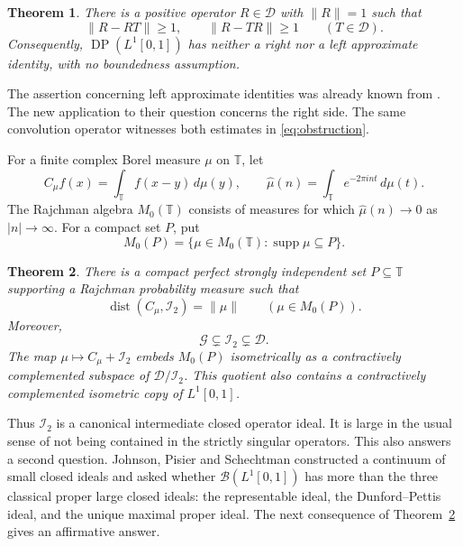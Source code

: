 \documentclass[11pt,reqno]{amsart}
\newtheorem{theorem}{Theorem}[section]
\theoremstyle{definition}
\theoremstyle{remark}
\newcommand{\T}{\mathbb T}
\newcommand{\B}{\mathcal B}
\newcommand{\D}{\mathcal D}
\newcommand{\G}{\mathcal G}
\newcommand{\I}{\mathcal I}
\newcommand{\DP}{\operatorname{DP}}
\newcommand{\supp}{\operatorname{supp}}
\newcommand{\dist}{\operatorname{dist}}
\begin{document}
\begin{theorem}\label{thm:ai}
There is a positive operator $R\in\D$ with $\|R\|=1$ such that
\begin{equation}\label{eq:obstruction}
 \|R-RT\|\geq1,\qquad \|R-TR\|\geq1\qquad(T\in\D).
\end{equation}
Consequently, $\DP(L^1[0,1])$ has neither a right nor a left approximate identity, with no boundedness assumption.
\end{theorem}

The assertion concerning left approximate identities was already known from \cite[Theorem~2.1]{JS}. The new application to their question concerns the right side. The same convolution operator witnesses both estimates in \eqref{eq:obstruction}.

For a finite complex Borel measure $\mu$ on $\T$, let
\[
 C_\mu f(x)=\int_\T f(x-y)\,d\mu(y),\qquad
 \widehat\mu(n)=\int_\T e^{-2\pi int}\,d\mu(t).
\]
The Rajchman algebra $M_0(\T)$ consists of measures for which $\widehat\mu(n)\to0$ as $|n|\to\infty$. For a compact set $P$, put
\[
 M_0(P)=\{\mu\in M_0(\T):\supp\mu\subseteq P\}.
\]

\begin{theorem}\label{thm:square}
There is a compact perfect strongly independent set $P\subseteq\T$ supporting a Rajchman probability measure such that
\begin{equation}\label{eq:exact-distance}
 \dist(C_\mu,\I_2)=\|\mu\|\qquad(\mu\in M_0(P)).
\end{equation}
Moreover,
\begin{equation}\label{eq:strict}
 \G\subsetneq\I_2\subsetneq\D.
\end{equation}
The map $\mu\mapsto C_\mu+\I_2$ embeds $M_0(P)$ isometrically as a contractively complemented subspace of $\D/\I_2$. This quotient also contains a contractively complemented isometric copy of $L^1[0,1]$.
\end{theorem}

Thus $\I_2$ is a canonical intermediate closed operator ideal. It is large in the usual sense of not being contained in the strictly singular operators. This also answers a second question. Johnson, Pisier and Schechtman \cite[Introduction]{JPS} constructed a continuum of small closed ideals and asked whether $\B(L^1[0,1])$ has more than the three classical proper large closed ideals: the representable ideal, the Dunford--Pettis ideal, and the unique maximal proper ideal. The next consequence of Theorem~\ref{thm:square} gives an affirmative answer.
\end{document}
